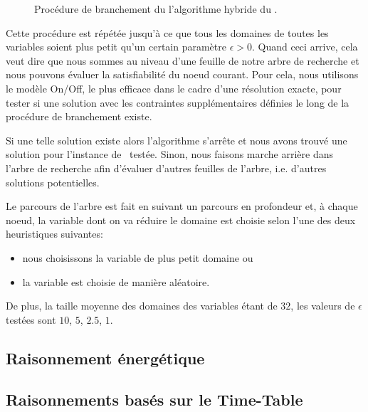 \begin{figure}[!htb] 
  
  \caption{Procédure de branchement du l'algorithme hybride du \CECSP.}
  \label{fib:branching}
\end{figure}

Cette procédure est répétée jusqu'à ce que tous les domaines de toutes
les variables soient plus petit qu'un certain paramètre $\epsilon
>0$. Quand ceci arrive, cela veut dire que nous sommes au niveau d'une
feuille de notre arbre de recherche et nous pouvons évaluer la
satisfiabilité du noeud courant. Pour cela, nous utilisons le modèle
On/Off, le plus efficace dans le cadre d'une résolution exacte, pour
tester si une solution avec les contraintes supplémentaires définies
le long de la procédure de branchement existe.

Si une telle solution existe alors l'algorithme s'arrête et nous avons
trouvé une solution pour l'instance de \CECSP~testée. Sinon, nous
faisons marche arrière dans l'arbre de recherche afin d'évaluer
d'autres feuilles de l'arbre, i.e. d'autres solutions potentielles. 

Le parcours de l'arbre est fait en suivant un parcours en profondeur
et, à chaque noeud,  la variable dont on va réduire le domaine est
choisie selon l'une des deux heuristiques suivantes: 
\begin{itemize}
\item nous choisissons la variable de plus petit domaine ou 
\item la variable est choisie de manière aléatoire.
\end{itemize}
De plus, la taille moyenne des domaines des variables étant de $32$,
les valeurs de $\epsilon$ testées sont $10$, $5$, $2.5$, $1$.

\subsection{Raisonnement énergétique}
\label{sec:expe_RE}

\subsection{Raisonnements basés sur le Time-Table}
\label{sec:expe_TT}

